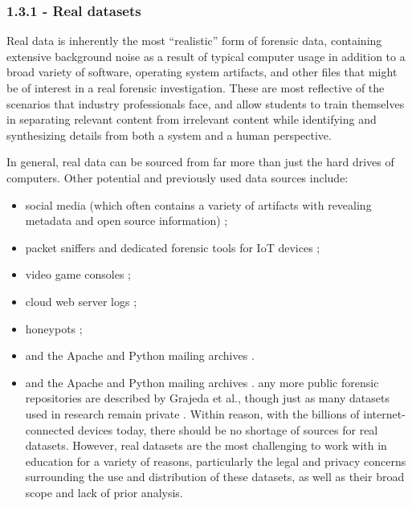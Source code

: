 \subsubsection{1.3.1 - Real datasets}\label{real-datasets}

Real data is inherently the most ``realistic'' form of forensic data,
containing extensive background noise as a result of typical computer
usage in addition to a broad variety of software, operating system
artifacts, and other files that might be of interest in a real forensic
investigation. These are most reflective of the scenarios that industry
professionals face, and allow students to train themselves in separating
relevant content from irrelevant content while identifying and
synthesizing details from both a system and a human perspective.

In general, real data can be sourced from far more than just the hard
drives of computers. Other potential and previously used data sources
include:

\begin{itemize}
\item
  social media (which often contains a variety of artifacts with
  revealing metadata and open source information)
  \cite{baggiliDataSourcesAdvancing2015};
\item
  packet sniffers and dedicated forensic tools for IoT devices
  \cite{meffertForensicStateAcquisition2017};
\item
  video game consoles
  \cite{grajedaAvailabilityDatasetsDigital2017,pessolanoForensicAnalysisNintendo2019};
\item
  cloud web server logs \cite{rahmanNewWebForensic2020};
\item
  honeypots \cite{mochForensicImageGenerator2009};
\item
  and the Apache and Python mailing archives
  \cite{grajedaAvailabilityDatasetsDigital2017}.
\item
  and the Apache and Python mailing archives
  \cite{grajedaAvailabilityDatasetsDigital2017}. any more public
  forensic repositories are described by Grajeda et al., though just as
  many datasets used in research remain private
  \cite{grajedaAvailabilityDatasetsDigital2017}. Within reason, with
  the billions of internet-connected devices today, there should be no
  shortage of sources for real datasets. However, real datasets are the
  most challenging to work with in education for a variety of reasons,
  particularly the legal and privacy concerns surrounding the use and
  distribution of these datasets, as well as their broad scope and lack
  of prior analysis.
\end{itemize}

